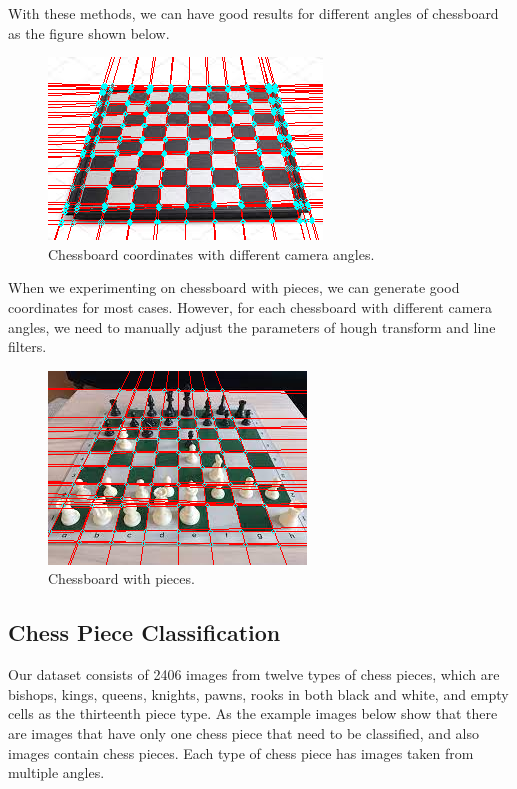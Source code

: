 \documentclass[a4paper,12pt]{article}
\begin{document}
\begin{spacing}{1.3}
With these methods, we can have good results for different angles of chessboard as the figure shown below.

\begin{figure}[H]
	\centering
	\includegraphics[scale=0.6]{6.png}
	\caption{Chessboard coordinates with different camera angles.}
\end{figure}

When we experimenting on chessboard with pieces, we can generate good coordinates for most cases. However, for each chessboard with different camera angles, we need to manually adjust the parameters of hough transform and line filters.

\begin{figure}[H]
	\centering
	\includegraphics[scale=0.7]{x.png}
	\caption{Chessboard with pieces.}
\end{figure}

\subsection{Chess Piece Classification}

Our dataset consists of 2406 images from twelve types of chess pieces, which are bishops, kings, queens, knights, pawns, rooks in both black and white, and empty cells as the thirteenth piece type. As the example images below show that there are images that have only one chess piece that need to be classified, and also images contain chess pieces. Each type of chess piece has images taken from multiple angles.


\end{spacing}
\end{document}
